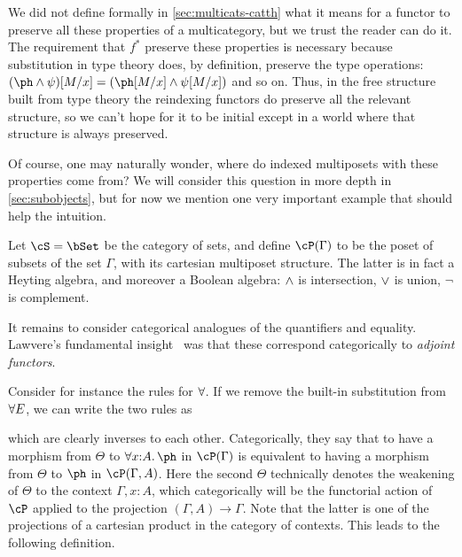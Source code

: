 We did not define formally in \cref{sec:multicats-catth} what it means for a functor to preserve all these properties of a multicategory, but we trust the reader can do it.
The requirement that $f^*$ preserve these properties is necessary because substitution in type theory does, by definition, preserve the type operations: $(\ph\meet\psi)[M/x] = (\ph[M/x] \meet \psi[M/x])$ and so on.
Thus, in the free structure built from type theory the reindexing functors do preserve all the relevant structure, so we can't hope for it to be initial except in a world where that structure is always preserved.

Of course, one may naturally wonder, where do indexed multiposets with these properties come from?
We will consider this question in more depth in \cref{sec:subobjects}, but for now we mention one very important example that should help the intuition.

\begin{eg}\label{eg:subset-hyperdoctrine}
  Let $\cS=\bSet$ be the category of sets, and define $\cP(\Gamma)$ to be the poset of subsets of the set $\Gamma$, with its cartesian multiposet structure.
  The latter is in fact a Heyting algebra, and moreover a Boolean algebra: $\wedge$ is intersection, $\vee$ is union, $\neg$ is complement.
\end{eg}

It remains to consider categorical analogues of the quantifiers and equality.
Lawvere's fundamental insight~\cite{lawvere:adjointness,lawvere:comprehension} was that these correspond categorically to \emph{adjoint functors}.

Consider for instance the rules for $\all$.
If we remove the built-in substitution from $\forallE$, we can write the two rules as
which are clearly inverses to each other.
Categorically, they say that to have a morphism from $\Theta$ to $\forall x:A.\ph$ in $\cP(\Gamma)$ is equivalent to having a morphism from $\Theta$ to $\ph$ in $\cP(\Gamma,A)$.
Here the second $\Theta$ technically denotes the weakening of $\Theta$ to the context $\Gamma,x:A$, which categorically will be the functorial action of $\cP$ applied to the projection $(\Gamma,A)\to \Gamma$.
Note that the latter is one of the projections of a cartesian product in the category of contexts.
This leads to the following definition.

